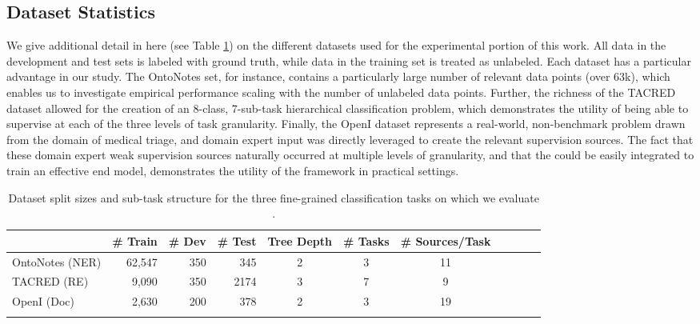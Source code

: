 \documentclass[letterpaper]{article}
\begin{document}
\begin{appendix}
\subsection{Dataset Statistics}
We give additional detail in here (see Table \ref{tab:datasets}) on the different datasets used for the experimental portion of this work.  All data in the development and test sets is labeled with ground truth, while data in the training set is treated as unlabeled.  Each dataset has a particular advantage in our study.  The OntoNotes set, for instance, contains a particularly large number of relevant data points (over 63k), which enables us to investigate empirical performance scaling with the number of unlabeled data points.  Further, the richness of the TACRED dataset allowed for the creation of an 8-class, 7-sub-task hierarchical classification problem, which demonstrates the utility of being able to supervise at each of the three levels of task granularity.  Finally, the OpenI dataset represents a real-world, non-benchmark problem drawn from the domain of medical triage, and domain expert input was directly leveraged to create the relevant supervision sources.  The fact that these domain expert weak supervision sources naturally occurred at multiple levels of granularity, and that the could be easily integrated to train an effective end model, demonstrates the utility of the \systemx framework in practical settings.
\begin{table}[hbt!]
\setlength\tabcolsep{5pt}
{
\vspace{10pt}
\centering
\begin{tabular}{lrrrccccccc}
      \toprule
           & \# Train & \# Dev & \# Test & Tree Depth & \# Tasks & \# Sources/Task \\
      \midrule
      OntoNotes (NER)
        & 62,547
        & 350
        & 345
        & 2
        & 3
        & 11
        \\
      TACRED (RE)
        & 9,090
        & 350
        & 2174
        & 3
        & 7
        & 9
        \\
      OpenI (Doc)
        & 2,630
        & 200
        & 378
        & 2
        & 3
        & 19
        \\
      \bottomrule\\
    \end{tabular}
    \caption{Dataset split sizes and sub-task structure for the three fine-grained classification tasks on which we evaluate \systemx.}
    \label{tab:datasets}
}
\end{table}


\end{appendix}
\end{document}
